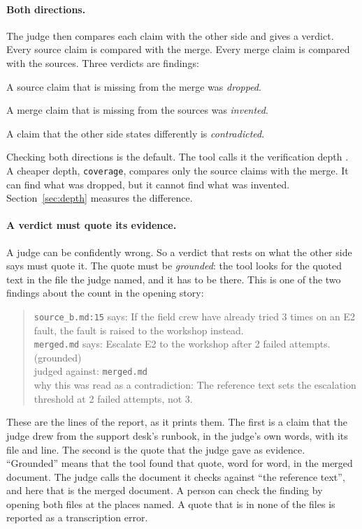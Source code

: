 \paragraph{Both directions.} The judge then compares each claim with the other side and gives a verdict. Every source claim is compared with the merge. Every merge claim is compared with the sources. Three verdicts are findings:
\begin{points}
\item A source claim that is missing from the merge was \emph{dropped}.
\item A merge claim that is missing from the sources was \emph{invented}.
\item A claim that the other side states differently is \emph{contradicted}.
\end{points}

\noindent Checking both directions is the default. The tool calls it the verification depth \texttt{}. A cheaper depth, \texttt{coverage}, compares only the source claims with the merge. It can find what was dropped, but it cannot find what was invented. Section~\ref{sec:depth} measures the difference.

\paragraph{A verdict must quote its evidence.} A judge can be confidently wrong. So a verdict that rests on what the other side says must quote it. The quote must be \emph{grounded}: the tool looks for the quoted text in the file the judge named, and it has to be there. This is one of the two findings about the count in the opening story:

\begin{quote}\small
\texttt{source\_b.md:15} says: If the field crew have already tried 3 times on an E2 fault, the fault is raised to the workshop instead.\\[3pt]
\texttt{merged.md} says: \textquotesingle{}Escalate E2 to the workshop after 2 failed attempts.\textquotesingle{} (grounded)\\[3pt]
judged against: \texttt{merged.md}\\[3pt]
why this was read as a contradiction: The reference text sets the escalation threshold at 2 failed attempts, not 3.
\end{quote}

\noindent These are the lines of the report, as it prints them. The first is a claim that the judge drew from the support desk's runbook, in the judge's own words, with its file and line. The second is the quote that the judge gave as evidence. ``Grounded'' means that the tool found that quote, word for word, in the merged document. The judge calls the document it checks against ``the reference text'', and here that is the merged document. A person can check the finding by opening both files at the places named. A quote that is in none of the files is reported as a transcription error.

